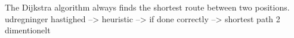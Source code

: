 The Dijkstra algorithm always finds the shortest route between two positions. 
udregninger
hastighed --> heuristic --> if done correctly --> shortest path
2 dimentionelt

